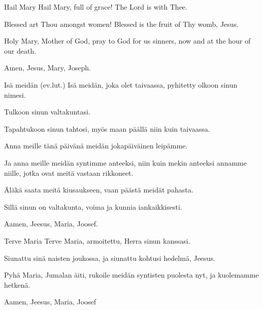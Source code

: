   \begin{passage}[EN]{Hail Mary}
    Hail Mary,
    full of grace!
    The Lord is with Thee.
    \par
    Blessed art Thou amongst women!
    Blessed is the fruit of Thy womb, Jesus.
    \par
    Holy Mary, Mother of God,
    pray to God for us sinners,
    now and at the hour of our death.
    \par
    Amen, Jesus, Mary, Joseph.
  \end{passage}
  \vspace{\fill}
  \hardbrk
  \vspace*{10ex} %
  \begin{passage}[FI]{Isä meidän {\scriptsize(ev.lut.)}}
    Isä meidän, joka olet taivaassa,
    pyhitetty olkoon sinun nimesi.
    \par
    Tulkoon sinun valtakuntasi.
    \par
    Tapahtukoon sinun tahtosi,
    myös maan päällä niin kuin taivaassa.
    \par
    Anna meille tänä päivänä
    meidän jokapäiväinen leipämme.
    \par
    Ja anna meille meidän syntimme anteeksi,
    niin kuin mekin anteeksi annamme niille,
    jotka ovat meitä vastaan rikkoneet.
    \par
    Äläkä saata meitä kiusaukseen,
    vaan päästä meidät pahasta.
    \par
    Sillä sinun on valtakunta,
    voima ja kunnia iankaikkisesti.
    \par
    Aamen, Jeesus, Maria, Joosef.
  \end{passage}
  \begin{passage}[FI]{Terve Maria}
    Terve Maria, armoitettu,
    Herra sinun kanssasi.
    \par
    Siunattu sinä naisten joukossa,
    ja siunattu kohtusi hedelmä, Jeesus.
    \par
    Pyhä Maria, Jumalan äiti, rukoile meidän
    syntisten puolesta nyt, ja kuolemamme hetkenä.
    \par
    Aamen, Jeesus, Maria, Joosef
  \end{passage}
  \vspace*{\fill}
\endsong


